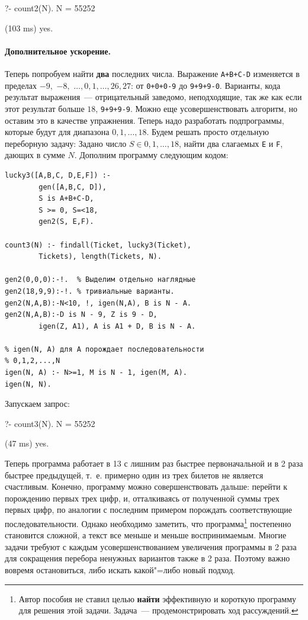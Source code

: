 \documentclass[a4paper,14pt, openany, twoside, draft]{extbook} %
\begin{document}
\begin{proexp}
?- count2(N).
N = 55252

(103 ms) yes.
\end{proexp}

\paragraph{Дополнительное ускорение.} Теперь попробуем найти \textbf{два} последних числа. Выражение \texttt{A+B+C-D} изменяется в пределах $-9,$ $-8,$ $\ldots,0,1,\ldots,26,27$: от \texttt{0+0+0-9} до \texttt{9+9+9-0}. Варианты, кода результат выражения~--- отрицательный заведомо, неподходящие, так же как если этот результат больше $18$, \texttt{9+9+9-9}. Можно еще усовершенствовать алгоритм, но оставим это в качестве упражнения. Теперь надо разработать подпрограммы, которые будут для диапазона $0,1,\ldots,18$. Будем решать просто отдельную переборную задачу: Задано число $S \in 0,1,\ldots,18$, найти два слагаемых \texttt{E} и \texttt{F}, дающих в сумме $N$. Дополним программу следующим кодом:

\begin{verbatim}
lucky3([A,B,C, D,E,F]) :-
        gen([A,B,C, D]),
        S is A+B+C-D,
        S >= 0, S=<18,
        gen2(S, E,F).

count3(N) :- findall(Ticket, lucky3(Ticket),
        Tickets), length(Tickets, N).

gen2(0,0,0):-!.  % Выделим отдельно наглядные
gen2(18,9,9):-!. % тривиальные варианты.
gen2(N,A,B):-N<10, !, igen(N,A), B is N - A.
gen2(N,A,B):-D is N - 9, Z is 9 - D,
        igen(Z, A1), A is A1 + D, B is N - A.

% igen(N, A) для A порождает последовательности
% 0,1,2,...,N
igen(N, A) :- N>=1, M is N - 1, igen(M, A).
igen(N, N).
\end{verbatim}

\noindent{}Запускаем запрос:

\begin{proexp}
?- count3(N).
N = 55252

(47 ms) yes.
\end{proexp}


Теперь программа работает в 13 с лишним раз быстрее первоначальной и в 2 раза быстрее предыдущей, т.~е. примерно один из трех билетов не является счастливым. Конечно, программу можно совершенствовать дальше: перейти к порождению первых трех цифр, и, отталкиваясь от полученной суммы трех первых цифр, по аналогии с последним примером порождать соответствующие последовательности. Однако необходимо заметить, что программа\footnote{Автор пособия не ставил целью \textbf{найти} эффективную и короткую программу для решения этой задачи. Задача~--- продемонстрировать ход рассуждений.} постепенно становится сложной, а текст все меньше и меньше воспринимаемым. Многие задачи требуют с каждым усовершенствованием увеличения программы в 2 раза для сокращения перебора ненужных вариантов также в 2 раза. Поэтому важно вовремя остановиться, либо искать какой"=либо новый подход.
\end{document}
